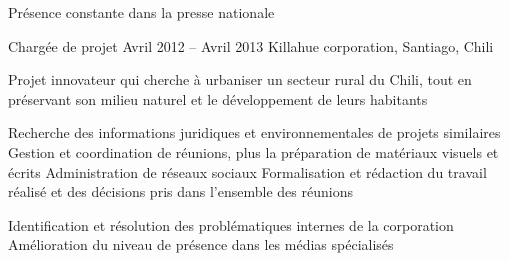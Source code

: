 \begin{joblist}
{\begin{itemize}
		\end{itemize}       
		 Présence constante dans la presse nationale
	}




\item[Chargée de projet]{Avril 2012 -- Avril 2013 }     
	{Killahue corporation, Santiago, Chili}     
	{
		 Projet innovateur qui cherche à urbaniser un secteur rural du Chili, tout en préservant son milieu naturel et le développement de leurs habitants \\
			 
		\iftbftiny \setlength{\parskip}{-10pt} \fi
		\begin{itemize}
			  \iftbftiny \setlength\itemsep{-3pt} \fi
			  \cvitem[\checkmark] Recherche des informations juridiques et environnementales de projets similaires          
			  \cvitem[\checkmark] Gestion et coordination de réunions, plus la préparation de matériaux visuels et écrits   
			  \cvitem[\checkmark] Administration de réseaux sociaux                                                                    
			  \cvitem[\checkmark] Formalisation et rédaction du travail réalisé et des décisions pris dans l’ensemble des réunions     
		\end{itemize}      

		\mission{}            Identification et résolution des problématiques internes de la corporation \\
		\mission{} 	      Amélioration du niveau de présence dans les médias spécialisés \\
	}
  
       

   

\end{joblist}


%
%


